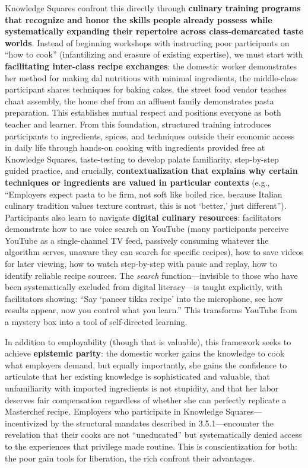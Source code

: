 Knowledge Squares confront this directly through \textbf{culinary
training programs that recognize and honor the skills people already
possess while systematically expanding their repertoire across
class-demarcated taste worlds}. Instead of beginning workshops with
instructing poor participants on ``how to cook'' (infantilizing and
erasure of existing expertise), we must start with \textbf{facilitating
inter-class recipe exchanges}: the domestic worker demonstrates her
method for making dal nutritious with minimal ingredients, the
middle-class participant shares techniques for baking cakes, the street
food vendor teaches chaat assembly, the home chef from an affluent
family demonstrates pasta preparation. This establishes mutual respect
and positions everyone as both teacher and learner. From this
foundation, structured training introduces participants to ingredients,
spices, and techniques outside their economic access in daily life
through hands-on cooking with ingredients provided free at Knowledge
Squares, taste-testing to develop palate familiarity, step-by-step
guided practice, and crucially, \textbf{contextualization that explains
why certain techniques or ingredients are valued in particular contexts}
(e.g., ``Employers expect pasta to be firm, not soft like boiled rice,
because Italian culinary tradition values texture contrast, this is not
`better,' just different''). Participants also learn to navigate
\textbf{digital culinary resources}: facilitators demonstrate how to use
voice search on YouTube (many participants perceive YouTube as a
single-channel TV feed, passively consuming whatever the algorithm
serves, unaware they can search for specific recipes), how to save
videos for later viewing, how to watch step-by-step with pause and
replay, how to identify reliable recipe sources. The \emph{search}
function---invisible to those who have been systematically excluded from
digital literacy---is taught explicitly, with facilitators showing:
``Say `paneer tikka recipe' into the microphone, see how results appear,
now you control what you learn.'' This transforms YouTube from a mystery
box into a tool of self-directed learning.

In addition to employability (though that is valuable), this framework
seeks to achieve \textbf{epistemic parity}: the domestic worker gains
the knowledge to cook what employers demand, but equally importantly,
she gains the confidence to articulate that her existing knowledge is
sophisticated and valuable, that unfamiliarity with imported ingredients
is not stupidity, and that her labor deserves fair compensation
regardless of whether she can perfectly replicate a Masterchef recipe.
Employers who participate in Knowledge Squares---incentivized by the
structural mandates described in 3.5.1---encounter the revelation that
their cooks are not ``uneducated'' but systematically denied access to
the experiences that privilege made routine. This is conscientization
for both: the poor gain tools for liberation, the rich confront their
advantages.

